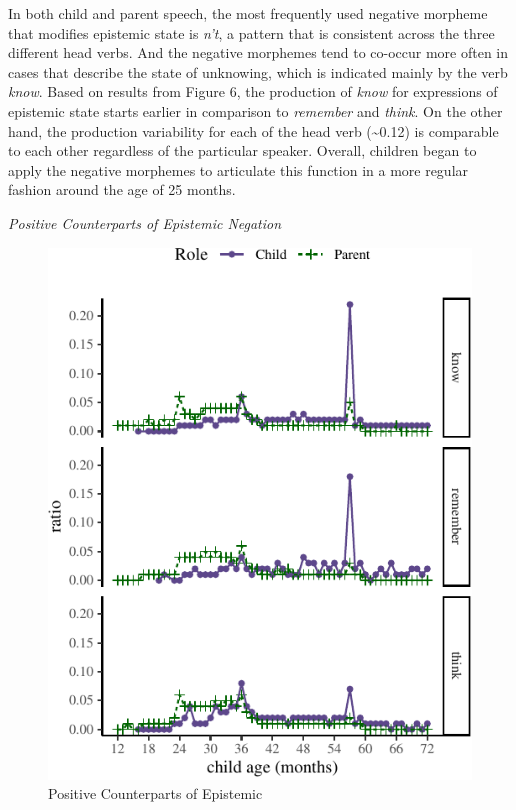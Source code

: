 \documentclass[
  english,
  man,floatsintext]{apa6}
\begin{document}
In both child and parent speech, the most frequently used negative morpheme that modifies epistemic state is \emph{n't}, a pattern that is consistent across the three different head verbs. And the negative morphemes tend to co-occur more often in cases that describe the state of unknowing, which is indicated mainly by the verb \emph{know}. Based on results from Figure 6, the production of \emph{know} for expressions of epistemic state starts earlier in comparison to \emph{remember} and \emph{think}. On the other hand, the production variability for each of the head verb (\textasciitilde0.12) is comparable to each other regardless of the particular speaker. Overall, children began to apply the negative morphemes to articulate this function in a more regular fashion around the age of 25 months.

\emph{Positive Counterparts of Epistemic Negation}

\begin{figure}[H]

{\centering \includegraphics{neg_combos_full_files/figure-latex/posepistemic-1} 

}

\caption{Positive Counterparts of Epistemic}\label{fig:posepistemic}
\end{figure}
\end{document}
